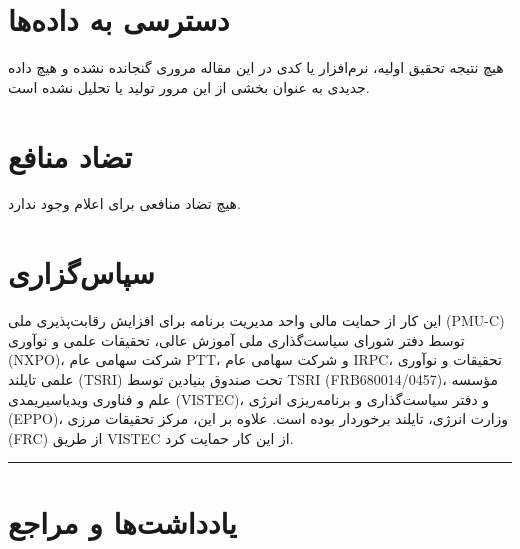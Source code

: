 \documentclass[12pt,a4paper,twocolumn]{article} %
\newcommand{\persian}[1]{\textfarsi{#1}}
\newcommand{\english}[1]{\textenglish{#1}}
\begin{document}

\section*{\persian{دسترسی به داده‌ها}}
\persian{
هیچ نتیجه تحقیق اولیه، نرم‌افزار یا کدی در این مقاله مروری گنجانده نشده و هیچ داده جدیدی به عنوان بخشی از این مرور تولید یا تحلیل نشده است.
}

\vspace{1em}

\section*{\persian{تضاد منافع}}
\persian{
هیچ تضاد منافعی برای اعلام وجود ندارد.
}

\vspace{1em}

\section*{\persian{سپاس‌گزاری}}
\persian{
این کار از حمایت مالی واحد مدیریت برنامه برای افزایش رقابت‌پذیری ملی (\english{PMU-C}) توسط دفتر شورای سیاست‌گذاری ملی آموزش عالی، تحقیقات علمی و نوآوری (\english{NXPO})، شرکت سهامی عام \english{PTT}، و شرکت سهامی عام \english{IRPC}، تحقیقات و نوآوری علمی تایلند (\english{TSRI}) تحت صندوق بنیادین توسط \english{TSRI (FRB680014/0457)}، مؤسسه علم و فناوری ویدیاسیریمدی (\english{VISTEC})، و دفتر سیاست‌گذاری و برنامه‌ریزی انرژی (\english{EPPO})، وزارت انرژی، تایلند برخوردار بوده است. علاوه بر این، مرکز تحقیقات مرزی (\english{FRC}) از طریق \english{VISTEC} از این کار حمایت کرد.
}

\vspace{2em}

\rule{\columnwidth}{0.4pt}
\vspace{1em}


\section*{\persian{یادداشت‌ها و مراجع}}
\end{document}
